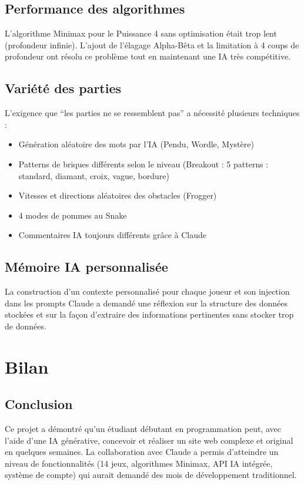 \documentclass[a4paper, 12pt, twoside]{article}
\begin{document}
\subsection{Performance des algorithmes}

L'algorithme Minimax pour le Puissance 4 sans optimisation était trop lent (profondeur infinie). L'ajout de l'élagage Alpha-Bêta et la limitation à 4 coups de profondeur ont résolu ce problème tout en maintenant une IA très compétitive.

\subsection{Variété des parties}

L'exigence que ``les parties ne se ressemblent pas'' a nécessité plusieurs techniques :
\begin{itemize}
  \item Génération aléatoire des mots par l'IA (Pendu, Wordle, Mystère)
  \item Patterns de briques différents selon le niveau (Breakout : 5 patterns : standard, diamant, croix, vague, bordure)
  \item Vitesses et directions aléatoires des obstacles (Frogger)
  \item 4 modes de pommes au Snake
  \item Commentaires IA toujours différents grâce à Claude
\end{itemize}

\subsection{Mémoire IA personnalisée}

La construction d'un contexte personnalisé pour chaque joueur et son injection dans les prompts Claude a demandé une réflexion sur la structure des données stockées et sur la façon d'extraire des informations pertinentes sans stocker trop de données.

\newpage

\section{Bilan}

\subsection{Conclusion}

Ce projet a démontré qu'un étudiant débutant en programmation peut, avec l'aide d'une IA générative, concevoir et réaliser un site web complexe et original en quelques semaines. La collaboration avec Claude a permis d'atteindre un niveau de fonctionnalités (14 jeux, algorithmes Minimax, API IA intégrée, système de compte) qui aurait demandé des mois de développement traditionnel.
\end{document}
